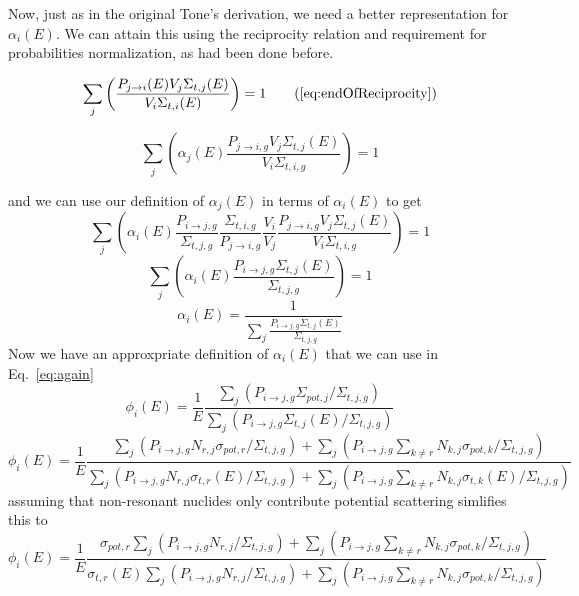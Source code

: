 \documentclass[10pt]{article}
\begin{document}
Now, just as in the original Tone's derivation, we need a better representation for $\alpha_i(E)$. We can attain this using the reciprocity relation and requirement for probabilities normalization, as had been done before.

  \begin{equation}\sum\limits_{j}\left(\frac{P_{j\rightarrow i}(E)V_{j}\Sigma_{t,j}(E)}{V_{i}\Sigma_{t,i}(E)}\right)=1\tag{\ref{eq:endOfReciprocity}}\end{equation}

    
    \begin{equation}\sum\limits_{j}\left(\alpha_j(E)\frac{P_{j\rightarrow i,g}V_{j}\Sigma_{t,j}(E)}{V_{i}\Sigma_{t,i,g}}\right)=1\end{equation}

      and we can use our definition of $\alpha_j(E)$ in terms of $\alpha_i(E)$ to get 
    \begin{equation}\sum\limits_{j}\left(\alpha_{i}(E)\frac{P_{i\rightarrow j,g}}{\Sigma_{t,j,g}}\frac{\Sigma_{t,i,g}}{P_{j\rightarrow i,g}}\frac{V_{i}}{V_{j}}\frac{P_{j\rightarrow i,g}V_{j}\Sigma_{t,j}(E)}{V_{i}\Sigma_{t,i,g}}\right)=1\end{equation}
    \begin{equation}\sum\limits_{j}\left(\alpha_{i}(E)\frac{P_{i\rightarrow j,g}\Sigma_{t,j}(E)}{\Sigma_{t,j,g}}\right)=1\end{equation}
      \begin{equation}\alpha_i(E)=\frac{1}{\sum\limits_{j}\frac{P_{i\rightarrow j,g}\Sigma_{t,j}(E)}{\Sigma_{t,j,g}}}\end{equation}
        Now we have an approxpriate definition of $\alpha_i(E)$ that we can use in Eq.~\ref{eq:again}
  \begin{equation}\phi_{i}(E)=\frac{1}{E}\frac{\sum\limits_j\left(P_{i\rightarrow j,g}\Sigma_{pot,j}\Big/\Sigma_{t,j,g}\right)}{\sum\limits_{j}\left(P_{i\rightarrow j,g}\Sigma_{t,j}(E)\Big/\Sigma_{t,j,g}\right)}\end{equation}
    \begin{equation}\phi_{i}(E)=\frac{1}{E}\frac{\sum\limits_j\left(P_{i\rightarrow j,g}N_{r,j}\sigma_{pot,r}\Big/\Sigma_{t,j,g}\right) +\sum\limits_j\left(P_{i\rightarrow j,g}\sum\limits_{k\neq r}N_{k,j}\sigma_{pot,k}\Big/\Sigma_{t,j,g}\right) }{
    \sum\limits_{j}\left(P_{i\rightarrow j,g}N_{r,j}\sigma_{t,r}(E)\Big/\Sigma_{t,j,g}\right) + \sum\limits_{j}\left(P_{i\rightarrow j,g}\sum\limits_{k\neq r}N_{k,j}\sigma_{t,k}(E)\Big/\Sigma_{t,j,g}\right)}\end{equation}
assuming that non-resonant nuclides only contribute potential scattering simlifies this to 
    \begin{equation}\phi_{i}(E)=\frac{1}{E}\frac{\sigma_{pot,r}\sum\limits_j\left(P_{i\rightarrow j,g}N_{r,j}\Big/\Sigma_{t,j,g}\right) +\sum\limits_j\left(P_{i\rightarrow j,g}\sum\limits_{k\neq r}N_{k,j}\sigma_{pot,k}\Big/\Sigma_{t,j,g}\right) }{
    \sigma_{t,r}(E)\sum\limits_{j}\left(P_{i\rightarrow j,g}N_{r,j}\Big/\Sigma_{t,j,g}\right) + \sum\limits_{j}\left(P_{i\rightarrow j,g}\sum\limits_{k\neq r}N_{k,j}\sigma_{pot,k}\Big/\Sigma_{t,j,g}\right)}\end{equation}
\end{document}
